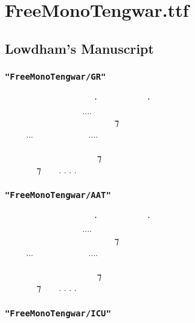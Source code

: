 \documentclass[11pt,a4paper]{article}
\begin{document}
\tableofcontents

\newpage

\section{FreeMonoTengwar.ttf}

\subsection{Lowdham’s Manuscript}

\subsubsection*{\texttt{"FreeMonoTengwar/GR"}}

\freeGR
  ‍   ⸱‍  ‍ ⸱ \\
    ‍....  ‍  \\
  ‍   ‍ ‍ ⁊ ‍  \\
...  ....   \\
         ‍ \\
 ‍ ‍‍   ⁊  ‍ ‍ \\
 ‍ ⁊  . . . . \normalfont

\subsubsection*{\texttt{"FreeMonoTengwar/AAT"}}

\freeAAT
  ‍   ⸱‍  ‍ ⸱ \\
    ‍....  ‍  \\
  ‍   ‍ ‍ ⁊ ‍  \\
...  ....   \\
         ‍ \\
 ‍ ‍‍   ⁊  ‍ ‍ \\
 ‍ ⁊  . . . . \normalfont

\subsubsection*{\texttt{"FreeMonoTengwar/ICU"}}
\end{document}
